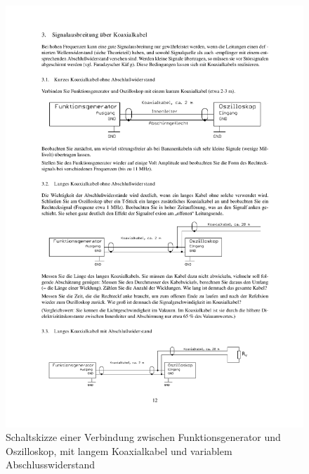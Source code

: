 \documentclass[12pt,a4paper]{article}
\begin{document}
\begin{figure}[H] 
  \centering
    \includegraphics[trim = 10mm 25mm 10mm 235mm, clip, scale = 1]{3-3_3+1.pdf}
  	\caption[Schaltskizze einer Verbindung zwischen Funktionsgenerator und Oszilloskop, mit langem Koaxialkabel und variablem Abschlusswiderstand]{Schaltskizze einer Verbindung zwischen Funktionsgenerator und Oszilloskop, mit langem Koaxialkabel und variablem Abschlusswiderstand\footnotemark}
  \label{fig:3.5}
\end{figure}
\end{document}
